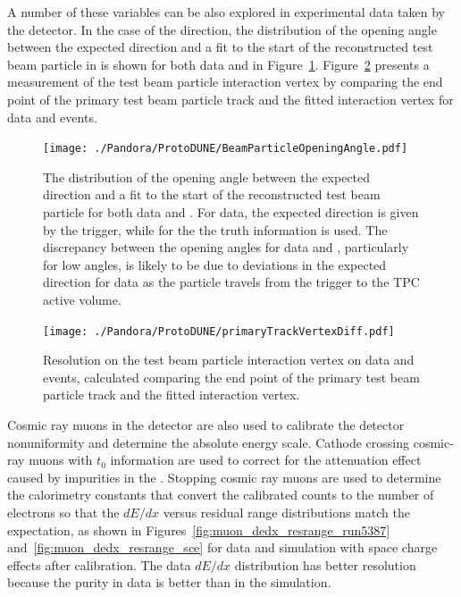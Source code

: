 A number of these variables can be also explored in experimental data taken by the  detector. In the case of the direction, the distribution of the opening angle between the expected direction and a fit to the start of the reconstructed test beam particle in  is shown for both data and  in Figure~\ref{fig:pandora_protodune_openingangle}.    Figure~\ref{fig:pandora_protodune_vertex} presents a measurement of the test beam particle interaction vertex by comparing the end point of the primary test beam particle track and the fitted interaction vertex for  data and  events. 

\begin{figure}[!ht]
\centering
\texttt{[image: ./Pandora/ProtoDUNE/BeamParticleOpeningAngle.pdf]}
\caption[Distribution of opening angle between expected direction and fit to reconstructed test beam particle, data and ]{The distribution of the opening angle between the expected direction and a fit to the start of the reconstructed test beam particle for both data and .  For data, the expected direction is given by the trigger, while for the  the truth information is used.  The discrepancy between the opening angles for data and , particularly for low angles, is likely to be due to deviations in the expected direction for data as the particle travels from the trigger to the TPC active volume.}
\label{fig:pandora_protodune_openingangle}
\end{figure}



\begin{figure}[!ht]
\centering
\texttt{[image: ./Pandora/ProtoDUNE/primaryTrackVertexDiff.pdf]}
\caption[Resolution on the test beam particle interaction vertex on  data and  events]{Resolution on the test beam particle interaction vertex on  data and  events, calculated comparing the end point of the primary test beam particle track and the fitted interaction vertex.}
\label{fig:pandora_protodune_vertex}
\end{figure}

Cosmic ray muons in the  detector are also used to calibrate the detector nonuniformity and determine the absolute energy scale. Cathode crossing cosmic-ray muons with $t_{0}$ information are used to correct for the attenuation effect caused by impurities in the \lar. Stopping cosmic ray muons are used to determine the calorimetry constants that convert the calibrated  counts to the number of electrons so that the $dE/dx$ versus residual range distributions match the expectation, as shown in Figures~\ref{fig:muon_dedx_resrange_run5387} and~\ref{fig:muon_dedx_resrange_sce} for  data and  simulation with space charge effects after calibration. The data $dE/dx$ distribution has better resolution because the purity in data is better than in the simulation. 

